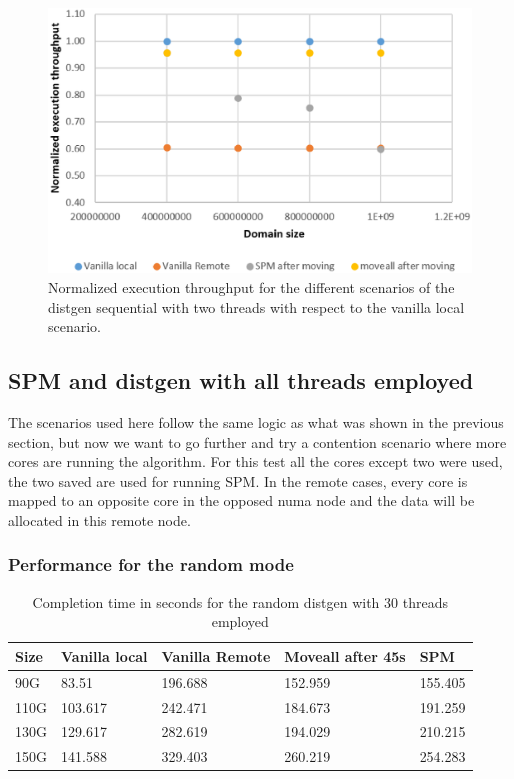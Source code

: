 \begin{figure}[th]
	\centering
		\includegraphics[width=.8\textwidth]{figures/thrput-dgentt-ser.eps}
		\caption{Normalized execution throughput for the different scenarios of the distgen sequential with two threads with respect to the vanilla local scenario.}
		\label{fig:thrput-dgentt-ser}
\end{figure}

\subsection{SPM and distgen with all threads employed}\label{subsection:res-spmydistgen-at}

The scenarios used here follow the same logic as what was shown in the previous section, but now we want to go further and try a contention scenario where more cores are running the algorithm. For this test all the cores except two were used, the two saved are used for running SPM. In the remote cases, every core is mapped to an opposite core in the opposed numa node and the data will be allocated in this remote node.

\subsubsection{Performance for the random mode}\label{subsection:time-dgenat-random.eps}


\begin{table}[th]
	\centering
		\begin{tabularx}{\textwidth}{|l|l|l|l|X|}
		\hline
			Size & Vanilla local & Vanilla Remote & Moveall after 45s & SPM \\
			\hline
			90G & 83.51 & 196.688 & 152.959 & 155.405\\
			\hline
			110G & 103.617 & 242.471 & 184.673 & 191.259\\
			\hline
			130G & 129.617 & 282.619 &194.029 & 210.215\\
			\hline
			150G & 141.588 & 329.403 & 260.219 & 254.283\\
			\hline
		\end{tabularx}
		\caption{Completion time in seconds for the random distgen with 30 threads employed}
		\label{table:res-dgenrdmat-time}
\end{table}

